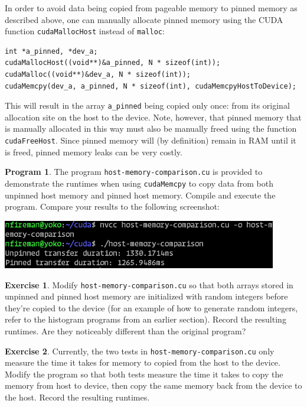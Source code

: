 \documentclass{article}
\theoremstyle{definition}
\newtheorem{program}{Program}
\newtheorem{exercise}{Exercise}
\begin{document}
In order to avoid data being copied from pageable memory to pinned memory as described above, one can manually allocate pinned memory using the CUDA function \texttt{cudaMallocHost} instead of \texttt{malloc}:
\begin{verbatim}
int *a_pinned, *dev_a;
cudaMallocHost((void**)&a_pinned, N * sizeof(int));
cudaMalloc((void**)&dev_a, N * sizeof(int));
cudaMemcpy(dev_a, a_pinned, N * sizeof(int), cudaMemcpyHostToDevice);
\end{verbatim}

This will result in the array \texttt{a\_pinned} being copied only once: from its original allocation site on the host to the device. Note, however, that pinned memory that is manually allocated in this way must also be manually freed using the function \texttt{cudaFreeHost}. Since pinned memory will (by definition) remain in RAM until it is freed, pinned memory leaks can be very costly.

\begin{program}
The program \texttt{host-memory-comparison.cu} is provided to demonstrate the runtimes when using \texttt{cudaMemcpy} to copy data from both unpinned host memory and pinned host memory. Compile and execute the program. Compare your results to the following screenshot:

\includegraphics[width=0.9\textwidth]{images/host-memory-comparison-output.png}
\end{program}

\begin{exercise}
Modify \texttt{host-memory-comparison.cu} so that both arrays stored in unpinned and pinned host memory are initialized with random integers before they're copied to the device (for an example of how to generate random integers, refer to the histogram programs from an earlier section). Record the resulting runtimes. Are they noticeably different than the original program?
\end{exercise}

\begin{exercise}
Currently, the two tests in \texttt{host-memory-comparison.cu} only measure the time it takes for memory to copied from the host to the device. Modify the program so that both tests measure the time it takes to copy the memory from host to device, then copy the same memory back from the device to the host. Record the resulting runtimes.
\end{exercise}
\end{document}
